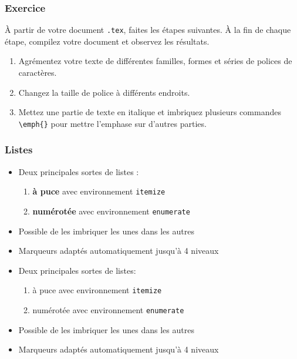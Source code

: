 
\begin{frame}[fragile,c]

	\frametitle{Exercice \thenoExercice}
	
	À partir de votre document \texttt{.tex}, faites les étapes suivantes. À la fin de chaque étape,
	compilez votre document et observez les résultats.
	
	\begin{enumerate}
		\item Agrémentez votre texte de différentes familles, formes et séries de polices de caractères.
		\item Changez la taille de police à différents endroits.
		\item Mettez une partie de texte en italique et imbriquez plusieurs commandes 
			\lstinline|\emph{}| pour mettre l'emphase sur d'autres parties.
	\end{enumerate}
\end{frame}


\begin{frame}[fragile]

	\frametitle{Listes}
	
	\begin{itemize}
		\item Deux principales sortes de listes :
		\begin{enumerate}
			\item \textbf{à puce} avec environnement \texttt{itemize}
			\item \textbf{numérotée} avec environnement \texttt{enumerate}
		\end{enumerate}
		\item Possible de les imbriquer les unes dans les autres
		\item Marqueurs adaptés automatiquement jusqu'à 4 niveaux
	\end{itemize}

	\pause
	
	\begin{codesource}
	\begin{itemize}
		\item Deux principales sortes de listes:
		\begin{enumerate}
			\item à puce avec environnement \verb=itemize=
			\item numérotée avec environnement \verb=enumerate=
		\end{enumerate}
		\item Possible de les imbriquer les unes
			dans les autres
		\item Marqueurs adaptés automatiquement jusqu'à 4 niveaux
	\end{itemize}
	\end{codesource}

\end{frame}

